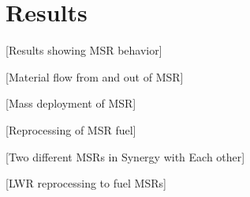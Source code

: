 \section{Results}

[Results showing MSR behavior]

[Material flow from and out of MSR]

[Mass deployment of MSR]

[Reprocessing of MSR fuel]

[Two different MSRs in Synergy with Each other]

[LWR reprocessing to fuel MSRs]